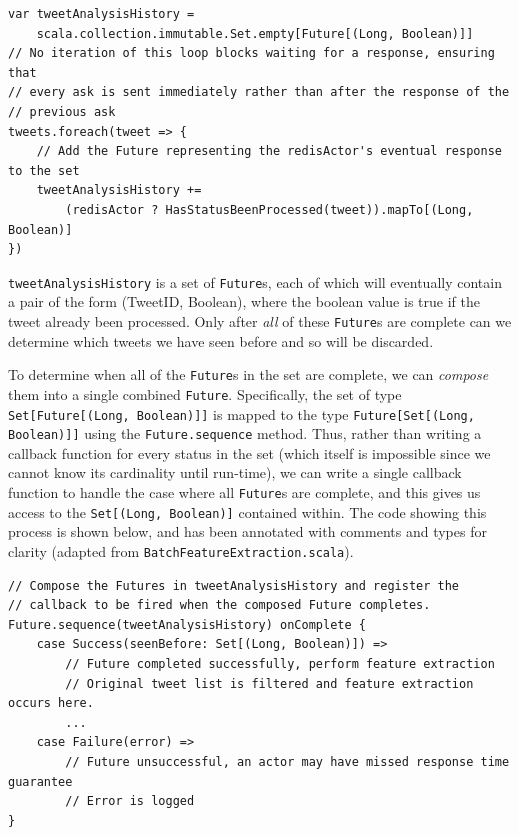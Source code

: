 \documentclass{l4proj}
\newcommand{\code}[1]{\texttt{#1}}
\begin{document}
\begin{lstlisting}[caption=Check asynchronously whether a status has already been processed.]
var tweetAnalysisHistory = 
    scala.collection.immutable.Set.empty[Future[(Long, Boolean)]]
// No iteration of this loop blocks waiting for a response, ensuring that
// every ask is sent immediately rather than after the response of the 
// previous ask
tweets.foreach(tweet => {
    // Add the Future representing the redisActor's eventual response to the set
    tweetAnalysisHistory += 
        (redisActor ? HasStatusBeenProcessed(tweet)).mapTo[(Long, Boolean)]
})
\end{lstlisting}
        
\code{tweetAnalysisHistory} is a set of \code{Future}s, each of which will eventually contain a pair of the form (TweetID, Boolean), where the boolean value is true if the tweet already been processed. Only after \textit{all} of these \code{Future}s are complete can we determine which tweets we have seen before and so will be discarded.

To determine when all of the \code{Future}s in the set are complete, we can \textit{compose} them into a single combined \code{Future}. Specifically, the set of type \code{Set[Future[(Long, Boolean)]]} is mapped to the type \code{Future[Set[(Long, Boolean)]]} using the \code{Future.sequence} method. Thus, rather than writing a callback function for every status in the set (which itself is impossible since we cannot know its cardinality until run-time), we can write a single callback function to handle the case where all \code{Future}s are complete, and this gives us access to the \code{Set[(Long, Boolean)]} contained within. The code showing this process is shown below, and has been annotated with comments and types for clarity (adapted from  \code{BatchFeatureExtraction.scala}).

\begin{lstlisting}[caption=Composing Futures unto a single future and registering the onComplete callback.]
// Compose the Futures in tweetAnalysisHistory and register the
// callback to be fired when the composed Future completes.
Future.sequence(tweetAnalysisHistory) onComplete {
    case Success(seenBefore: Set[(Long, Boolean)]) =>
        // Future completed successfully, perform feature extraction
        // Original tweet list is filtered and feature extraction occurs here.
        ...
    case Failure(error) =>
        // Future unsuccessful, an actor may have missed response time guarantee
        // Error is logged
}
\end{lstlisting}
\end{document}

